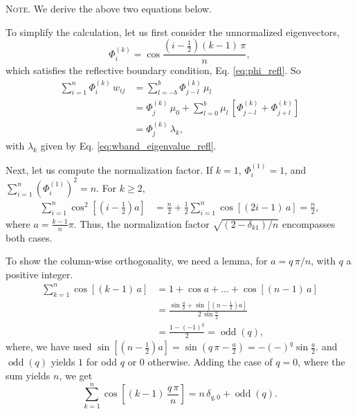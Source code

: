 \documentclass[reprint, floatfix]{revtex4-1}
\newcommand{\note}[1]{{\color{DarkGreen}\footnotesize \textsc{Note.} #1}}
\begin{document}
\note{We derive the above two equations below.

  To simplify the calculation,
  let us first consider the unnormalized eigenvectors,
  $$
  \Phi^{(k)}_i
  =
  \cos \frac{ \left( i - \frac 1 2 \right) (k - 1) \, \pi}{n},
  $$
  which satisfies the reflective boundary condition,
  Eq. \eqref{eq:phi_refl}.
  So
  $$
  \begin{aligned}
  \sum_{i = 1}^n
    \Phi^{(k)}_i \, w_{ij}
  &=
  \sum_{l = -b}^b
    \Phi^{(k)}_{j - l} \, \mu_l
  \\
  &=
    \Phi^{(k)}_j \, \mu_0
  + \sum_{l=0}^{b}
    \mu_l \,
    \left[
      \Phi^{(k)}_{j-l}
      +
      \Phi^{(k)}_{j+l}
    \right]
  \\
  &= \Phi^{(k)}_j \, \lambda_k,
  \end{aligned}
  $$
  with $\lambda_k$ given by Eq. \eqref{eq:wband_eigenvalue_refl}.

  \hrulefill

  Next, let us compute the normalization factor.
  If $k = 1$, $\Phi^{(1)}_i = 1$, and
  $
  \sum_{i = 1}^n \left( \Phi^{(1)}_i \right)^2 = n.
  $
  For $k \ge 2$,
  $$
  \begin{aligned}
    \sum_{i = 1}^n \cos^2 \left[\left(i - \frac1 2 \right) a\right]
    &=
    \frac n 2
    +
    \frac 1 2
    \sum_{i = 1}^n \cos\left[(2 i - 1)\, a \right]
    =
    \frac n 2,
  \end{aligned}
  $$
  where $a = \frac{k-1}{n} \pi$.
  Thus, the normalization factor $\sqrt{(2 - \delta_{k1})/n}$
  encompasses both cases.

  \hrulefill

  To show the column-wise orthogonality,
  we need a lemma, for $a = q \, \pi/n$,
  with $q$ a positive integer.
  $$
  \begin{aligned}
  \sum_{k = 1}^n \cos[(k - 1) \, a]
  &=
  1 + \cos a + \dots + \cos[(n - 1) \, a]
  \\
  &=
  \frac{
        \sin\frac a 2
      + \sin \left[ \left( n - \frac 1 2 \right) a \right]
      }
      {
        2 \, \sin \frac a 2
      }
  \\
  &=
  \frac{ 1 - (-1)^q } { 2 }
  = \operatorname{odd}(q),
  \end{aligned}
  $$
  where, we have used
  $\sin \left[ \left( n - \frac 1 2 \right) a \right]
  = \sin \left( q \, \pi - \frac a 2 \right)
  = -(-)^q\sin\frac a 2.$
  and $\operatorname{odd}(q)$
  yields $1$ for odd $q$ or $0$ otherwise.
  Adding the case of $q = 0$, where the sum yields $n$,
  we get
  $$
  \sum_{k = 1}^n
    \cos\left[(k - 1) \, \frac { q \, \pi } { n }  \right]
  = n \, \delta_{q, 0}
  + \operatorname{odd}(q).
  $$

}
\end{document}
